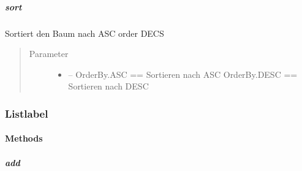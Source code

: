 \documentclass[letterpaper,10pt,ngerman]{sphinxmanual}
\begin{document}
\subparagraph{sort}
\label{\detokenize{com/linuxluigi/edu/list/BinaryLinkedList:sort}}

\begin{fulllineitems}
\label{\detokenize{com/linuxluigi/edu/list/BinaryLinkedList:com.linuxluigi.edu.list.BinaryLinkedList.sort(OrderBy)}}
Sortiert den Baum nach ASC order DECS
\begin{quote}\begin{description}
\item[{Parameter}] \leavevmode\begin{itemize}
\item {} 
 -- OrderBy.ASC == Sortieren nach ASC OrderBy.DESC == Sortieren nach DESC

\end{itemize}

\end{description}\end{quote}

\end{fulllineitems}



\subsubsection{Listlabel}
\label{\detokenize{com/linuxluigi/edu/list/Listlabel:listlabel}}\label{\detokenize{com/linuxluigi/edu/list/Listlabel::doc}}

\begin{fulllineitems}
\label{\detokenize{com/linuxluigi/edu/list/Listlabel:com.linuxluigi.edu.list.Listlabel}}
\end{fulllineitems}



\paragraph{Methods}
\label{\detokenize{com/linuxluigi/edu/list/Listlabel:methods}}

\subparagraph{add}
\label{\detokenize{com/linuxluigi/edu/list/Listlabel:add}}
\end{document}
